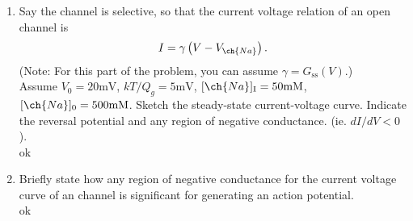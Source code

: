 \documentclass[11pt]{article}
\begin{document}
\begin{enumerate}[label=\arabic*.]
\begin{enumerate}[label=(\alph*)]
\vspace*{1\baselineskip}
\item
Say the channel is  selective, so that the current voltage relation of an open channel is
\begin{align*}
I = \gamma \left(V - V_{\ch{Na}}\right).
\end{align*}
(Note: For this part of the problem, you can assume $\gamma = G_{\text{ss}}(V)$.) \\
Assume $V_0 = 20 \text{mV}$, $kT / Q_g =5 \text{mV}$, $[\ch{Na}]_{\text{I}} = 50 \text{mM}$, $[\ch{Na}]_0 = 500 \text{mM}$. Sketch the steady-state current-voltage curve. Indicate the reversal potential and any region of negative conductance. (ie. $dI / dV < 0$).
\vspace*{1\baselineskip}
\\
ok








\vspace*{1\baselineskip}
\item
Briefly state how any region of negative conductance for the current voltage curve of an  channel is significant for generating an action potential.
\vspace*{1\baselineskip}
\\
ok









\end{enumerate}



\end{enumerate}
\end{document}
